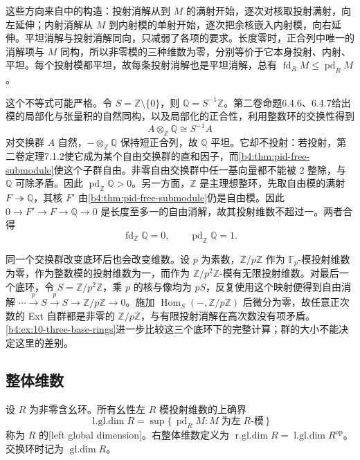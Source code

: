 这些方向来自中的构造：投射消解从到 \(M\) 的满射开始，逐次对核取投射满射，向左延伸；内射消解从 \(M\) 到内射模的单射开始，逐次把余核嵌入内射模，向右延伸。平坦消解与投射消解同向，只减弱了各项的要求。长度零时，正合列中唯一的消解项与 \(M\) 同构，所以非零模的三种维数为零，分别等价于它本身投射、内射、平坦。每个投射模都平坦，故每条投射消解也是平坦消解，总有 \(\operatorname{fd}_RM\le\operatorname{pd}_RM\)。

\ProseParagraphBreak
这个不等式可能严格。令 \(S=\mathbb Z\setminus\{0\}\)，则 \(\mathbb Q=S^{-1}\mathbb Z\)。第二卷命题6.4.6、6.4.7给出模的局部化与张量积的自然同构，以及局部化的正合性，利用整数环的交换性得到
\[
	A\otimes_{\mathbb Z}\mathbb Q\cong S^{-1}A
\]
对交换群 \(A\) 自然，\(-\otimes_{\mathbb Z}\mathbb Q\) 保持短正合列，故 \(\mathbb Q\) 平坦。它却不投射：若投射，第二卷定理7.1.2使它成为某个自由交换群的直和因子，而\cref{b4:thm:pid-free-submodule}使这个子群自由。非零自由交换群中任一基向量都不能被 \(2\) 整除，与 \(\mathbb Q\) 可除矛盾。因此 \(\operatorname{pd}_{\mathbb Z}\mathbb Q>0\)。另一方面，\(\mathbb Z\) 是主理想整环，先取自由模的满射 \(F\twoheadrightarrow\mathbb Q\)，其核 \(F'\) 由\cref{b4:thm:pid-free-submodule}仍是自由模。因此 \(0\to F'\to F\to\mathbb Q\to0\) 是长度至多一的自由消解，故其投射维数不超过一。两者合得
\[
	\operatorname{fd}_{\mathbb Z}\mathbb Q=0, \qquad \operatorname{pd}_{\mathbb Z}\mathbb Q=1.
\]

\ProseParagraphBreak
同一个交换群改变底环后也会改变维数。设 \(p\) 为素数，\(\mathbb Z/p\mathbb Z\) 作为 \(\mathbb F_p\)-模投射维数为零，作为整数模的投射维数为一，而作为 \(\mathbb Z/p^2\mathbb Z\)-模有无限投射维数。对最后一个底环，令 \(S=\mathbb Z/p^2\mathbb Z\)，乘 \(p\) 的核与像均为 \(pS\)，反复使用这个映射便得到自由消解 \(\cdots\xrightarrow{p}S\xrightarrow{p}S\to\mathbb Z/p\mathbb Z\to0\)。施加 \(\operatorname{Hom}_S(-,\mathbb Z/p\mathbb Z)\) 后微分为零，故任意正次数的 Ext 自群都是非零的 \(\mathbb Z/p\mathbb Z\)，与有限投射消解在高次数没有项矛盾。\cref{b4:ex:10-three-base-rings}进一步比较这三个底环下的完整计算；群的大小不能决定这里的差别。

\subsection{整体维数}
\label{b4:subsec:1001:02}

\begin{definition}\label{b4:def:global-dimension}
	设 \(R\) 为非零含幺环。所有幺性左 \(R\) 模投射维数的上确界
	\[
		\operatorname{l.gl.dim}R=\sup\{\,\operatorname{pd}_RM:M\;\text{为左}\;R\text{-模}\,\}
	\]
	称为 \(R\) 的[left global dimension]。右整体维数定义为 \(\operatorname{r.gl.dim}R=\operatorname{l.gl.dim}R^{\mathrm{op}}\)。交换环时记为 \(\operatorname{gl.dim}R\)。
\end{definition}


